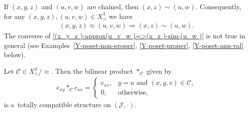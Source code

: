 \documentclass{jonasart}
\newcommand{\C}{\mathcal{C}}
\newcommand{\impl}{\Rightarrow}
\newcommand{\J}{\mathcal{J}}
\begin{document}
	\begin{remark}
		If $(x,y,z)$ and $(u,v,w)$ are chained, then $(x,z)\sim (u,w)$. Consequently, for any $(x,y,z),(u,v,w)\in X^3_<$ we have
		\begin{align}\label{(x_y_z )-approx(u_v_w )=>(x_z )-sim-(u_w )}
			(x,y,z)\approx(u,v,w)\impl(x,z)\sim(u,w).
		\end{align}
		The converse of \eqref{(x_y_z )-approx(u_v_w )=>(x_z )-sim-(u_w )} is not true in general (see Examples~\ref{Y-poset-non-proper}, \ref{Y-poset-proper}, \ref{Y-poset-ann-val} below).
	\end{remark}

	\begin{lemma}\label{*_C -tot-comp-with-cdot}
		Let $\C\in X^3_< /{\approx}$. Then the bilinear product $*_\C$ given by
		\begin{align}\label{e_x y*_C e_u v=e_x z-or-0}
			e_{xy}*_\C e_{uv}=
			\begin{cases}
				e_{xv}, & y=u\text{ and }(x,y,v)\in\C,\\
				0, & \text{otherwise},
			\end{cases}
		\end{align}
		is a~totally compatible structure on $(\J,\cdot)$.
	\end{lemma}
\end{document}
